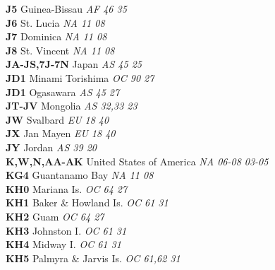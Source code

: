 ﻿\documentclass[landscape,a4paper]{article}
\begin{document}
\begin{multicols}{6}
\textbf{J5                      } Guinea-Bissau                      \emph{ AF     46     35    } \\
\textbf{J6                      } St. Lucia                          \emph{ NA     11     08    } \\
\textbf{J7                      } Dominica                           \emph{ NA     11     08    } \\
\textbf{J8                      } St. Vincent                        \emph{ NA     11     08    } \\
\textbf{JA-JS,7J-7N             } Japan                              \emph{ AS     45     25    } \\
\textbf{JD1                     } Minami Torishima                   \emph{ OC     90     27    } \\
\textbf{JD1                     } Ogasawara                          \emph{ AS     45     27    } \\
\textbf{JT-JV                   } Mongolia                           \emph{ AS     32,33  23    } \\
\textbf{JW                      } Svalbard                           \emph{ EU     18     40    } \\
\textbf{JX                      } Jan Mayen                          \emph{ EU     18     40    } \\
\textbf{JY                      } Jordan                             \emph{ AS     39     20    } \\
\textbf{K,W,N,AA-AK             } United States of America           \emph{ NA     06-08  03-05 } \\
\textbf{KG4                     } Guantanamo Bay                     \emph{ NA     11     08    } \\
\textbf{KH0                     } Mariana Is.                        \emph{ OC     64     27    } \\
\textbf{KH1                     } Baker \& Howland Is.               \emph{ OC     61     31    } \\
\textbf{KH2                     } Guam                               \emph{ OC     64     27    } \\
\textbf{KH3                     } Johnston I.                        \emph{ OC     61     31    } \\
\textbf{KH4                     } Midway I.                          \emph{ OC     61     31    } \\
\textbf{KH5                     } Palmyra \& Jarvis Is.              \emph{ OC     61,62  31    } \\

\end{multicols}
\end{document}
